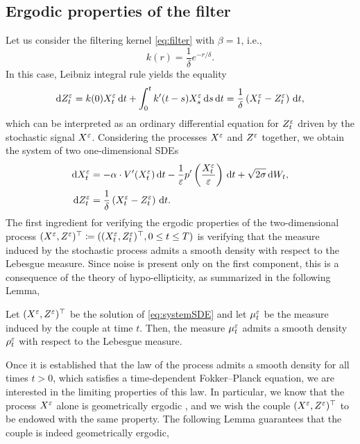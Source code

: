 \documentclass[10pt]{article}
\begin{document}
\subsection{Ergodic properties of the filter}\label{sec:ergodic}

Let us consider the filtering kernel \eqref{eq:filter} with $\beta = 1$, i.e.,
\begin{equation}\label{eq:filter_beta1}
	k(r) = \frac{1}{\delta} e^{-r/\delta}.
\end{equation}
In this case, Leibniz integral rule yields the equality
\begin{equation}
	\mathrm{d} Z^\varepsilon_t = k(0) X^\varepsilon_t \,\mathrm{d} t + \int_0^t k'(t-s) X^\varepsilon_s \,\mathrm{d} s \,\mathrm{d} t = \frac{1}{\delta} \left ( X^\varepsilon_t - Z^\varepsilon_t \right ) \,\mathrm{d} t,
\end{equation}
which can be interpreted as an ordinary differential equation for $Z_t^\varepsilon$ driven by the stochastic signal $X^\varepsilon$. Considering the processes $X^\varepsilon$ and $Z^\varepsilon$ together, we obtain the system of two one-dimensional SDEs
\begin{equation}
\label{eq:systemSDE}
\begin{aligned}
\mathrm{d} X_t^\varepsilon &= -\alpha \cdot V'(X_t^\varepsilon) \,\mathrm{d} t - \frac1{\varepsilon} p'\left(\frac{X_t^\varepsilon}{\varepsilon}\right) \,\mathrm{d} t+ \sqrt{2\sigma} \,\mathrm{d} W_t, \\
\mathrm{d} Z^\varepsilon_t &= \frac{1}{\delta} \left ( X^\varepsilon_t - Z^\varepsilon_t \right ) \,\mathrm{d} t.
\end{aligned}
\end{equation}
The first ingredient for verifying the ergodic properties of the two-dimensional process $(X^\varepsilon, Z^\varepsilon)^\top \coloneqq ((X^\varepsilon_t, Z^\varepsilon_t)^\top, 0 \leq t \leq T)$ is verifying that the measure induced by the stochastic process admits a smooth density with respect to the Lebesgue measure. Since noise is present only on the first component, this is a consequence of the theory of hypo-ellipticity, as summarized in the following Lemma, 

\begin{lemma}\label{lem:density} Let $(X^\varepsilon, Z^\varepsilon)^\top$ be the solution of \eqref{eq:systemSDE} and let $\mu^\varepsilon_t$ be the measure induced by the couple at time $t$. Then, the measure $\mu^\varepsilon_t$ admits a smooth density $\rho^\varepsilon_t$ with respect to the Lebesgue measure.
\end{lemma}


Once it is established that the law of the process admits a smooth density for all times $t>0$, which satisfies a time-dependent Fokker--Planck equation, we are interested in the limiting properties of this law. In particular, we know that the process $X^\varepsilon$ alone is geometrically ergodic \cite[Theorem 4.4]{MSH02}, and we wish the couple $(X^\varepsilon, Z^\varepsilon)^\top$ to be endowed with the same property. The following Lemma guarantees that the couple is indeed geometrically ergodic, 
\end{document}
